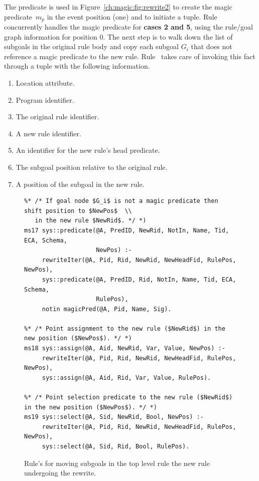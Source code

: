 The  predicate is used in Figure~\ref{ch:magic:fig:rewrite2} to
create the magic predicate~$m_p$ in the event position (one) and to initiate a
 tuple.  Rule~ concurrently handles the magic
predicate for {\bf cases 2 and 5}, using the rule/goal graph information for 
position $0$.  The next step is to walk down the list of subgoals in the
original rule body and copy each subgoal $G_{i}$ that does not reference a
magic predicate to the new rule.  Rule~ takes care of
invoking this fact through a  tuple with the following information.  
\begin{enumerate} 
  \ssp
  \item Location attribute.  
  \item Program identifier.
  \item The original rule identifier.
  \item A new rule identifier.
  \item An identifier for the new rule's head predicate.
  \item The subgoal position relative to the original rule.
  \item A position of the subgoal in the new rule.
\end{enumerate}

\begin{figure}
\ssp
\centering
\begin{lstlisting}
%* /* If goal node $G_i$ is not a magic predicate then shift position to $NewPos$  \\
   in the new rule $NewRid$. */ *)
ms17 sys::predicate(@A, PredID, NewRid, NotIn, Name, Tid, ECA, Schema,
                    NewPos) :-
     rewriteIter(@A, Pid, Rid, NewRid, NewHeadFid, RulePos, NewPos), 
     sys::predicate(@A, PredID, Rid, NotIn, Name, Tid, ECA, Schema, 
                    RulePos), 
     notin magicPred(@A, Pid, Name, Sig). 
	
%* /* Point assignment to the new rule ($NewRid$) in the new position ($NewPos$). */ *)
ms18 sys::assign(@A, Aid, NewRid, Var, Value, NewPos) :-
     rewriteIter(@A, Pid, Rid, NewRid, NewHeadFid, RulePos, NewPos),
     sys::assign(@A, Aid, Rid, Var, Value, RulePos).
	
%* /* Point selection predicate to the new rule ($NewRid$) in the new position ($NewPos$). */ *)
ms19 sys::select(@A, Sid, NewRid, Bool, NewPos) :-
     rewriteIter(@A, Pid, Rid, NewRid, NewHeadFid, RulePos, NewPos),
     sys::select(@A, Sid, Rid, Bool, RulePos).
\end{lstlisting}
\caption{\label{ch:magic:fig:rewrite3} Rule's for moving subgoals in the top level rule
the new rule undergoing the rewrite. }
\end{figure}

